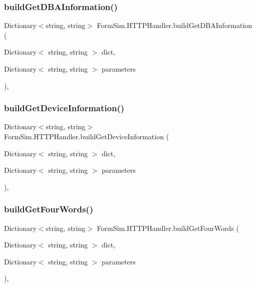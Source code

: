 \subsubsection{\texorpdfstring{build\+Get\+D\+B\+A\+Information()}{buildGetDBAInformation()}}
{\footnotesize\ttfamily Dictionary$<$string, string$>$ Form\+Sim.\+H\+T\+T\+P\+Handler.\+build\+Get\+D\+B\+A\+Information (\begin{DoxyParamCaption}\item[{Dictionary$<$ string, string $>$}]{dict,  }\item[{Dictionary$<$ string, string $>$}]{parameters }\end{DoxyParamCaption})\hspace{0.3cm}{\ttfamily [inline]}, {\ttfamily [private]}}

\mbox{\label{class_form_sim_1_1_h_t_t_p_handler_a867f024e3e119d6601814e41a63ce2d5}} 
\subsubsection{\texorpdfstring{build\+Get\+Device\+Information()}{buildGetDeviceInformation()}}
{\footnotesize\ttfamily Dictionary$<$string, string$>$ Form\+Sim.\+H\+T\+T\+P\+Handler.\+build\+Get\+Device\+Information (\begin{DoxyParamCaption}\item[{Dictionary$<$ string, string $>$}]{dict,  }\item[{Dictionary$<$ string, string $>$}]{parameters }\end{DoxyParamCaption})\hspace{0.3cm}{\ttfamily [inline]}, {\ttfamily [private]}}

\mbox{\label{class_form_sim_1_1_h_t_t_p_handler_a2530058a140656b8ca6648cf59dfb559}} 
\subsubsection{\texorpdfstring{build\+Get\+Four\+Words()}{buildGetFourWords()}}
{\footnotesize\ttfamily Dictionary$<$string, string$>$ Form\+Sim.\+H\+T\+T\+P\+Handler.\+build\+Get\+Four\+Words (\begin{DoxyParamCaption}\item[{Dictionary$<$ string, string $>$}]{dict,  }\item[{Dictionary$<$ string, string $>$}]{parameters }\end{DoxyParamCaption})\hspace{0.3cm}{\ttfamily [inline]}, {\ttfamily [private]}}

